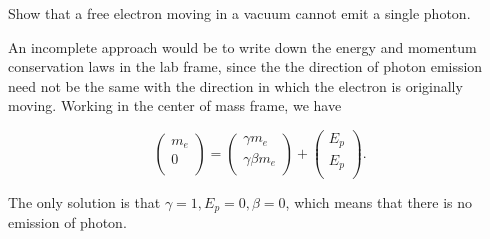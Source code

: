\documentclass[english,a4paper,12pt]{report}
\begin{document}
{Show that a free electron moving in a vacuum cannot emit a single photon.}
{An incomplete approach would be to write down the energy and momentum conservation laws in the lab frame, since the the direction of photon emission need not be the same with the direction in which the electron is originally moving. Working in the center of mass frame, we have

\begin{equation}
    \begin{pmatrix}
         m_{e}  \\
         0  \\
    \end{pmatrix} = \begin{pmatrix}
         \gamma m_{e}  \\
         \gamma \beta m_{e}  \\
    \end{pmatrix} + \begin{pmatrix}
         E_{p}  \\
         E_{p}  \\
    \end{pmatrix}. 
\end{equation}

The only solution is that \(\gamma = 1, E_{p}=0, \beta = 0\), which means that there is no emission of photon.

} 
\end{document}
